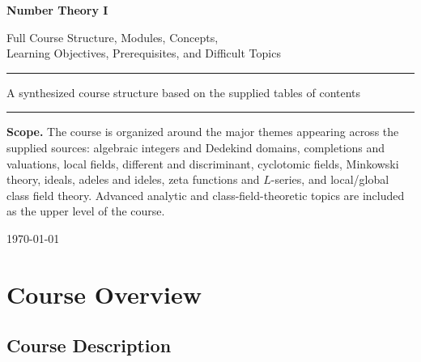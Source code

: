 \documentclass[11pt,a4paper]{article}
\begin{document}
\begin{titlepage}
    \centering
    \vspace*{1.5cm}

    {\Huge\bfseries Number Theory I\par}
    \vspace{0.5cm}

    {\Large Full Course Structure, Modules, Concepts,\\
    Learning Objectives, Prerequisites, and Difficult Topics\par}

    \vspace{1.5cm}

    \rule{\textwidth}{0.5pt}

    \vspace{0.5cm}

    {\large
    A synthesized course structure based on the supplied
    tables of contents
    }

    \vspace{0.5cm}
    \rule{\textwidth}{0.5pt}

    \vfill

    \begin{minipage}{0.9\textwidth}
    \small
    \textbf{Scope.}
    The course is organized around the major themes appearing across
    the supplied sources: algebraic integers and Dedekind domains,
    completions and valuations, local fields, different and
    discriminant, cyclotomic fields, Minkowski theory, ideals,
    adeles and ideles, zeta functions and \(L\)-series, and
    local/global class field theory.  Advanced analytic and
    class-field-theoretic topics are included as the upper level
    of the course.
    \end{minipage}

    \vfill

    {\large \today\par}
\end{titlepage}

\tableofcontents
\newpage

\section{Course Overview}

\subsection{Course Description}
\end{document}
